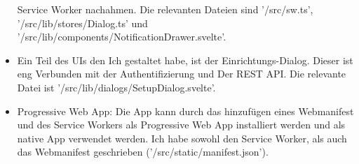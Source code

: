 \documentclass[a4paper]{article}
\begin{document}
\begin{itemize}
            Service Worker nachahmen. Die relevanten Dateien sind '/src/sw.ts',
            '/src/lib/stores/Dialog.ts' und
            '/src/lib/components/NotificationDrawer.svelte'.
      \item Ein Teil des UIs den Ich gestaltet habe, ist der
            Einrichtungs-Dialog. Dieser ist eng Verbunden mit der
            Authentifizierung und Der REST API. Die relevante Datei ist
            '/src/lib/dialogs/SetupDialog.svelte'.
      \item Progressive Web App: Die App kann durch das hinzufügen eines
            Webmanifest und des Service Workers als Progressive Web App
            installiert werden und als native App verwendet werden. Ich habe
            sowohl den Service Worker, als auch das Webmanifest geschrieben
            ('/src/static/manifest.json').
\end{itemize}
\end{document}

